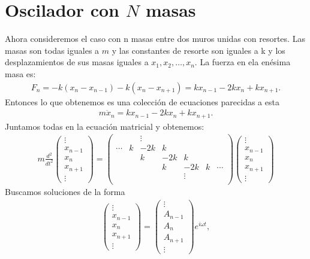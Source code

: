 \documentclass[letterpaper,12pt,oneside]{book}
\begin{document}
\section{Oscilador con \texorpdfstring{$N$}{N} masas}
Ahora consideremos el caso con n masas entre dos muros unidas con resortes. Las masas son todas iguales a $m$ y las constantes de resorte son iguales a k y los desplazamientos de sus masas iguales a $x_1,x_2,\dots,x_n$. La fuerza en ela en\'esima masa es: 
%
\begin{eqnarray}
F_n = -k(x_n - x_{n-1}) - k(x_n-x_{n+1})= kx_{n-1} - 2kx_n+kx_{n+1}.
\end{eqnarray}
%
Entonces lo que obtenemos es una colecci\'on de ecuaciones parecidas a esta
%
\begin{eqnarray}
m \ddot x_n = kx_{n-1}-2kx_n+kx_{n+1}\label{enesima}.
\end{eqnarray}
%
Juntamos todas en la ecuaci\'on matricial y obtenemos:
%
\begin{eqnarray}m\frac{d^2}{dt^2}
\begin{pmatrix}
\vdots\\
x_{n-1}\\
x_n\\
x_{n+1} \\
\vdots
\end{pmatrix} = \begin{pmatrix}
 & & \vdots \\
\cdots & k & -2k & k\\
 & & k & -2k & k\\
  & & & k & -2k & k & \cdots\\
  & & & & \vdots \\
\end{pmatrix}\begin{pmatrix}
\vdots\\
x_{n-1}\\
x_n\\
x_{n+1} \\
\vdots
\end{pmatrix}
\end{eqnarray}
%
Buscamos soluciones de la forma
%
\begin{eqnarray}
\begin{pmatrix}
\vdots\\
x_{n-1}\\
x_n\\
x_{n+1} \\
\vdots
\end{pmatrix} = \begin{pmatrix}
\vdots\\
A_{n-1}\\
A_n\\
A_{n+1} \\
\vdots
\end{pmatrix}e^{i\omega t},
\end{eqnarray}
\end{document}
